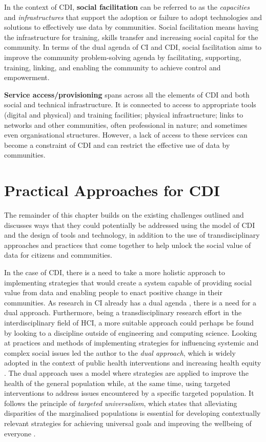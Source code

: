 In the context of CDI, \textbf{social facilitation} can be referred to as the \textit{capacities} and \textit{infrastructures} that support the adoption or failure to adopt technologies and solutions to effectively use data by communities. Social facilitation means having the infrastructure for training, skills transfer and increasing social capital for the community. In terms of the dual agenda of CI and CDI, social facilitation aims to improve the community problem-solving agenda by facilitating, supporting, training, linking, and enabling the community to achieve control and empowerment.
\newline

\textbf{Service access/provisioning} spans across all the elements of CDI and both social and technical infrastructure. It is connected to access to appropriate tools (digital and physical) and training facilities; physical infrastructure; links to networks and other communities, often professional in nature; and sometimes even organisational structures. However, a lack of access to these services can become a constraint of CDI and can restrict the effective use of data by communities.

\section{Practical Approaches for CDI}
\label{sec:pract_cdi}
The remainder of this chapter builds on the existing challenges outlined and discusses ways that they could potentially be addressed using the model of CDI and the design of tools and technology, in addition to the use of transdisciplinary approaches and practices that come together to help unlock the social value of data for citizens and communities.
\newline

In the case of CDI, there is a need to take a more holistic approach to implementing strategies that would create a system capable of providing social value from data and enabling people to enact positive change in their communities. As research in CI already has a dual agenda \citep{stillman_community_2009}, there is a need for a dual approach. Furthermore, being a transdisciplinary research effort in the interdisciplinary field of HCI, a more suitable approach could perhaps be found by looking to a discipline outside of engineering and computing science. Looking at practices and methods of implementing strategies for influencing systemic and complex social issues led the author to the \textit{dual approach}, which is widely adopted in the context of public health interventions \citep{bauer_prevention_2014} and increasing health equity \citep{graham_population_2016}. The dual approach uses a model where strategies are applied to improve the health of the general population while, at the same time, using targeted interventions to address issues encountered by a specific targeted population. It follows the principle of \textit{targeted universalism}, which states that alleviating disparities of the marginalised populations is essential for developing contextually relevant strategies for achieving universal goals and improving the wellbeing of everyone \citep{national_collaborating_centre_for_determinants_of_health_lets_2013}.

